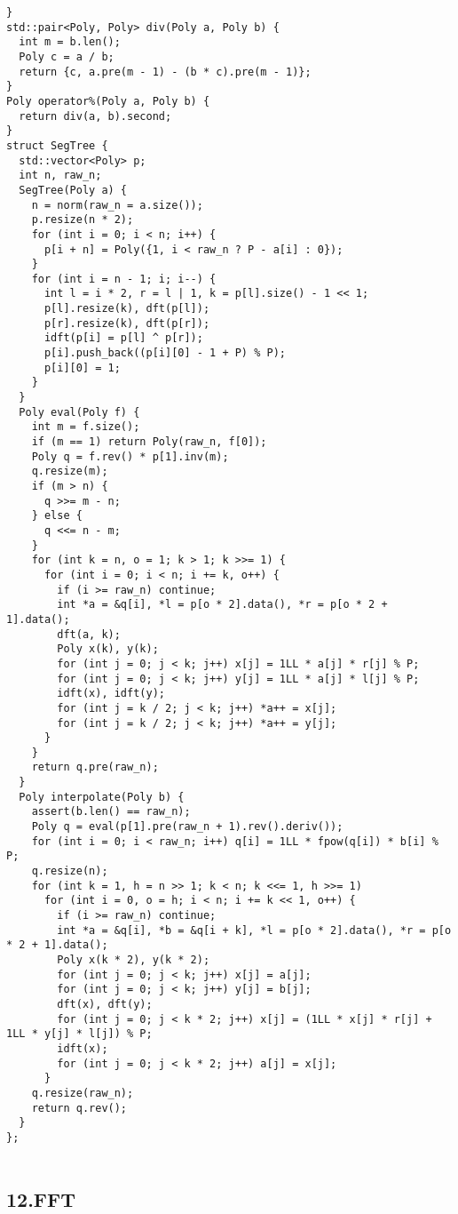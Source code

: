 \documentclass[]{article}
\begin{document}
\begin{verbatim}
}
std::pair<Poly, Poly> div(Poly a, Poly b) {
  int m = b.len();
  Poly c = a / b;
  return {c, a.pre(m - 1) - (b * c).pre(m - 1)};
}
Poly operator%(Poly a, Poly b) {
  return div(a, b).second;
}
struct SegTree {
  std::vector<Poly> p;
  int n, raw_n;
  SegTree(Poly a) {
    n = norm(raw_n = a.size());
    p.resize(n * 2);
    for (int i = 0; i < n; i++) {
      p[i + n] = Poly({1, i < raw_n ? P - a[i] : 0});
    }
    for (int i = n - 1; i; i--) {
      int l = i * 2, r = l | 1, k = p[l].size() - 1 << 1;
      p[l].resize(k), dft(p[l]);
      p[r].resize(k), dft(p[r]);
      idft(p[i] = p[l] ^ p[r]);
      p[i].push_back((p[i][0] - 1 + P) % P);
      p[i][0] = 1;
    }
  }
  Poly eval(Poly f) {
    int m = f.size();
    if (m == 1) return Poly(raw_n, f[0]);
    Poly q = f.rev() * p[1].inv(m);
    q.resize(m);
    if (m > n) {
      q >>= m - n;
    } else {
      q <<= n - m;
    }
    for (int k = n, o = 1; k > 1; k >>= 1) {
      for (int i = 0; i < n; i += k, o++) {
        if (i >= raw_n) continue;
        int *a = &q[i], *l = p[o * 2].data(), *r = p[o * 2 + 1].data();
        dft(a, k);
        Poly x(k), y(k);
        for (int j = 0; j < k; j++) x[j] = 1LL * a[j] * r[j] % P;
        for (int j = 0; j < k; j++) y[j] = 1LL * a[j] * l[j] % P;
        idft(x), idft(y);
        for (int j = k / 2; j < k; j++) *a++ = x[j];
        for (int j = k / 2; j < k; j++) *a++ = y[j];
      }
    }
    return q.pre(raw_n);
  }
  Poly interpolate(Poly b) {
    assert(b.len() == raw_n);
    Poly q = eval(p[1].pre(raw_n + 1).rev().deriv());
    for (int i = 0; i < raw_n; i++) q[i] = 1LL * fpow(q[i]) * b[i] % P;
    q.resize(n);
    for (int k = 1, h = n >> 1; k < n; k <<= 1, h >>= 1)
      for (int i = 0, o = h; i < n; i += k << 1, o++) {
        if (i >= raw_n) continue;
        int *a = &q[i], *b = &q[i + k], *l = p[o * 2].data(), *r = p[o * 2 + 1].data();
        Poly x(k * 2), y(k * 2);
        for (int j = 0; j < k; j++) x[j] = a[j];
        for (int j = 0; j < k; j++) y[j] = b[j];
        dft(x), dft(y);
        for (int j = 0; j < k * 2; j++) x[j] = (1LL * x[j] * r[j] + 1LL * y[j] * l[j]) % P;
        idft(x);
        for (int j = 0; j < k * 2; j++) a[j] = x[j];
      }
    q.resize(raw_n);
    return q.rev();
  }
};


\end{verbatim}

\hypertarget{fft}{%
\subsection{12.FFT}\label{fft}}
\end{document}
